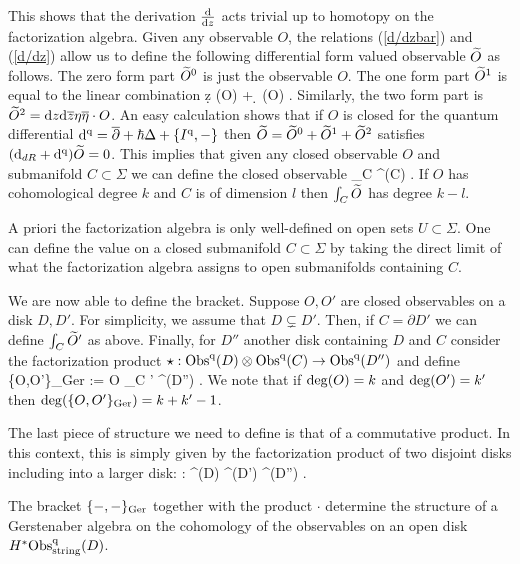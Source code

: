 This shows that the derivation $\frac{\d}{\d z}$ acts trivial up to homotopy on the factorization algebra.
Given any observable $O$, the relations (\ref{d/dzbar}) and (\ref{d/dz}) allow us to define the following differential form valued observable $\Tilde{O}$ as follows. 
The zero form part $\Tilde{O}^{0}$ is just the observable $O$. 
The one form part $\Tilde{O}^1$ is equal to the linear combination
\ben
\d z \; (\eta \cdot O) + \d \zbar \; (\Bar{\eta}\cdot O) . 
\een
Similarly, the two form part is $\Tilde{O}^2 = \d z \d \zbar \eta \Bar{\eta} \cdot O$. 
An easy calculation shows that if $O$ is closed for the quantum differential $\d^\q = \dbar + \hbar \Delta + \{I^\q, -\}$ then $\Tilde{O} = \Tilde{O}^{0} + \Tilde{O}^1 + \Tilde{O}^2$ satisfies $(\d_{dR} + \d^\q) \Tilde{O} = 0$. 
This implies that given any closed observable $O$ and submanifold $C \subset \Sigma$ we can define the closed observable
\ben
\int_C  \in \Obs^\q(C) .
\een
If $O$ has cohomological degree $k$ and $C$ is of dimension $l$ then $\int_C \Tilde{O}$ has degree $k - l$. 

\begin{rmk}
A priori the factorization algebra is only well-defined on open sets $U \subset \Sigma$. 
One can define the value on a closed submanifold $C \subset \Sigma$ by taking the direct limit of what the factorization algebra assigns to open submanifolds containing $C$. 
\end{rmk} 

We are now able to define the bracket. 
Suppose $O,O'$ are closed observables on a disk $D,D'$.
For simplicity, we assume that $D \subsetneq D'$. 
Then, if $C = \partial D'$ we can define $\int_C \Tilde{O}'$ as above. 
Finally, for $D''$ another disk containing $D$ and $C$ consider the factorization product $\star : \Obs^\q(D) \tensor \Obs^\q (C) \to \Obs^\q(D'')$ and define
\ben
\{O,O'\}_{\rm Ger} := O \star \int_C ' \in \Obs^\q (D'') .
\een 
We note that if ${\rm deg}(O) = k$ and ${\rm deg}(O') = k'$ then ${\rm deg}(\{O,O'\}_{\rm Ger}) = k+k' -1$. 

The last piece of structure we need to define is that of a commutative product. 
In this context, this is simply given by the factorization product of two disjoint disks including into a larger disk:
\ben
\cdot : \Obs^\q(D) \tensor \Obs^\q(D') \to \Obs^\q(D'') .
\een 

\begin{prop} The bracket $\{-,-\}_{\rm Ger}$ together with the product $\cdot$ determine the structure of a Gerstenaber algebra on the cohomology of the observables on an open disk $H^* \Obs^\q_{\rm string}(D)$. 
\end{prop}


